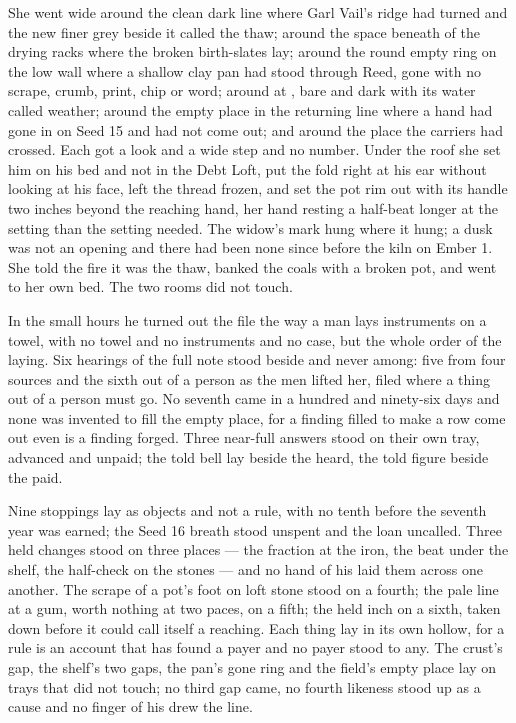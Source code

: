 She went wide around the clean dark line where Garl Vail's ridge had turned and the new finer grey beside it called the thaw; around the space beneath  of the drying racks where the broken birth-slates lay; around the round empty ring on the low wall where a shallow clay pan had stood through Reed, gone with no scrape, crumb, print, chip or word; around  at , bare and dark with its water called weather; around the empty place in the returning line where a hand had gone in on Seed 15 and had not come out; and around the place the carriers had crossed. Each got a look and a wide step and no number. Under the roof she set him on his bed and not in the Debt Loft, put the fold right at his ear without looking at his face, left the thread frozen, and set the pot rim out with its handle two inches beyond the reaching hand, her hand resting a half-beat longer at the setting than the setting needed. The widow's mark hung where it hung; a dusk was not an opening and there had been none since before the kiln on Ember 1. She told the fire it was the thaw, banked the coals with a broken pot, and went to her own bed. The two rooms did not touch.

\scenebreak

In the small hours he turned out the file the way a man lays instruments on a towel, with no towel and no instruments and no case, but the whole order of the laying. Six hearings of the full note stood beside and never among: five from four sources and the sixth out of a person as the men lifted her, filed where a thing out of a person must go. No seventh came in a hundred and ninety-six days and none was invented to fill the empty place, for a finding filled to make a row come out even is a finding forged. Three near-full answers stood on their own tray, advanced and unpaid; the told bell lay beside the heard, the told figure beside the paid.

Nine stoppings lay as objects and not a rule, with no tenth before the seventh year was earned; the Seed 16 breath stood unspent and the loan uncalled. Three held changes stood on three places --- the fraction at the iron, the beat under the shelf, the half-check on the stones --- and no hand of his laid them across one another. The scrape of a pot's foot on loft stone stood on a fourth; the pale line at a gum, worth nothing at two paces, on a fifth; the held inch on a sixth, taken down before it could call itself a reaching. Each thing lay in its own hollow, for a rule is an account that has found a payer and no payer stood to any. The crust's gap, the shelf's two gaps, the pan's gone ring and the field's empty place lay on trays that did not touch; no third gap came, no fourth likeness stood up as a cause and no finger of his drew the line.

